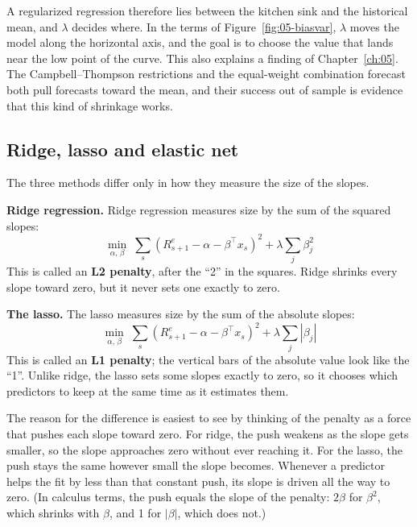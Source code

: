 A regularized regression therefore lies between the kitchen sink and the historical mean, and $\lambda$ decides where. In the terms of Figure~\ref{fig:05-biasvar}, $\lambda$ moves the model along the horizontal axis, and the goal is to choose the value that lands near the low point of the curve. This also explains a finding of Chapter~\ref{ch:05}. The Campbell--Thompson restrictions and the equal-weight combination forecast both pull forecasts toward the mean, and their success out of sample is evidence that this kind of shrinkage works.

\subsection{Ridge, lasso and elastic net}

The three methods differ only in how they measure the size of the slopes.

\textbf{Ridge regression.} Ridge regression measures size by the sum of the squared slopes:
\begin{equation}
  \min_{\alpha,\,\beta} \; \sum_{s} \left(R^{e}_{s+1} - \alpha - \beta^{\top} x_s\right)^2 + \lambda \sum_{j} \beta_j^2
  \label{eq:21-ridge}
\end{equation}
This is called an \textbf{L2 penalty}, after the ``2'' in the squares. Ridge shrinks every slope toward zero, but it never sets one exactly to zero.

\textbf{The lasso.} The lasso measures size by the sum of the absolute slopes:
\begin{equation}
  \min_{\alpha,\,\beta} \; \sum_{s} \left(R^{e}_{s+1} - \alpha - \beta^{\top} x_s\right)^2 + \lambda \sum_{j} |\beta_j|
  \label{eq:21-lasso}
\end{equation}
This is called an \textbf{L1 penalty}; the vertical bars of the absolute value look like the ``1''. Unlike ridge, the lasso sets some slopes exactly to zero, so it chooses which predictors to keep at the same time as it estimates them.

The reason for the difference is easiest to see by thinking of the penalty as a force that pushes each slope toward zero. For ridge, the push weakens as the slope gets smaller, so the slope approaches zero without ever reaching it. For the lasso, the push stays the same however small the slope becomes. Whenever a predictor helps the fit by less than that constant push, its slope is driven all the way to zero. (In calculus terms, the push equals the slope of the penalty: $2\beta$ for $\beta^2$, which shrinks with $\beta$, and 1 for $|\beta|$, which does not.)

